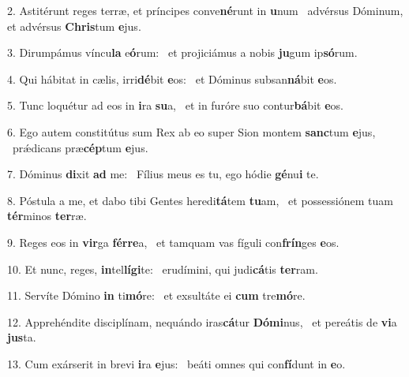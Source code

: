 2. Astitérunt reges terræ, et príncipes conve\textbf{né}runt in \textbf{u}num \ast\  advérsus Dóminum, et advérsus \textbf{Chris}tum \textbf{e}jus.\

3. Dirumpámus víncu\textbf{la} e\textbf{ó}rum: \ast\  et projiciámus a nobis \textbf{ju}gum ip\textbf{só}rum.\

4. Qui hábitat in cælis, irri\textbf{dé}bit \textbf{e}os: \ast\  et Dóminus subsan\textbf{ná}bit \textbf{e}os.\

5. Tunc loquétur ad eos in \textbf{i}ra \textbf{su}a, \ast\  et in furóre suo contur\textbf{bá}bit \textbf{e}os.\

6. Ego autem constitútus sum Rex ab eo super Sion montem \textbf{sanc}tum \textbf{e}jus, \ast\  prǽdicans præ\textbf{cép}tum \textbf{e}jus.\

7. Dóminus \textbf{di}xit \textbf{ad} me: \ast\  Fílius meus es tu, ego hódie \textbf{gé}nu\textbf{i} te.\

8. Póstula a me, et dabo tibi Gentes heredi\textbf{tá}tem \textbf{tu}am, \ast\  et possessiónem tuam \textbf{tér}minos \textbf{ter}ræ.\

9. Reges eos in \textbf{vir}ga \textbf{fér}\textbf{re}a, \ast\  et tamquam vas fíguli con\textbf{frín}ges \textbf{e}os.\

10. Et nunc, reges, \textbf{in}tel\textbf{lí}\textbf{gi}te: \ast\  erudímini, qui judi\textbf{cá}tis \textbf{ter}ram.\

11. Servíte Dómino \textbf{in} ti\textbf{mó}re: \ast\  et exsultáte ei \textbf{cum} tre\textbf{mó}re.\

12. Apprehéndite disciplínam, nequándo iras\textbf{cá}tur \textbf{Dó}\textbf{mi}nus, \ast\  et pereátis de \textbf{vi}a \textbf{jus}ta.\

13. Cum exárserit in brevi \textbf{i}ra \textbf{e}jus: \ast\  beáti omnes qui con\textbf{fí}dunt in \textbf{e}o.\

